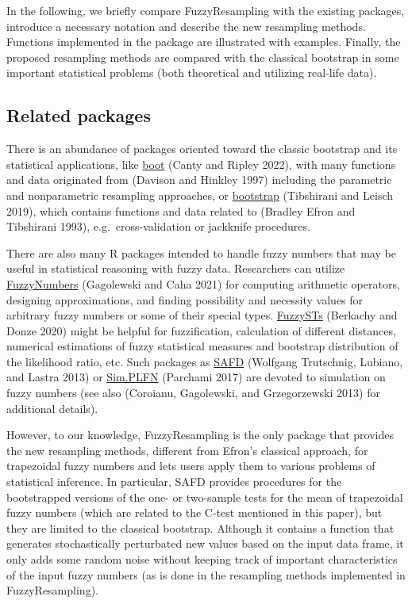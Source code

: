 In the following, we briefly compare FuzzyResampling with the existing
packages, introduce a necessary notation and describe the new resampling
methods. Functions implemented in the package are illustrated with
examples. Finally, the proposed resampling methods are compared with the
classical bootstrap in some important statistical problems (both
theoretical and utilizing real-life data).

\hypertarget{related-packages}{%
\subsection{Related packages}\label{related-packages}}

There is an abundance of packages oriented toward the classic bootstrap
and its statistical applications, like
\href{https://CRAN.R-project.org/package=boot}{boot} (Canty and Ripley 2022), with many
functions and data originated from (Davison and Hinkley 1997) including the
parametric and nonparametric resampling approaches, or
\href{https://CRAN.R-project.org/package=bootstrap}{bootstrap}
(Tibshirani and Leisch 2019), which contains functions and data related to
(Bradley Efron and Tibshirani 1993), e.g.~cross-validation or jackknife procedures.

There are also many R packages intended to handle fuzzy numbers that may
be useful in statistical reasoning with fuzzy data. Researchers can
utilize \href{https://CRAN.R-project.org/package=FuzzyNumbers}{FuzzyNumbers}
(Gagolewski and Caha 2021) for computing arithmetic operators, designing
approximations, and finding possibility and necessity values for
arbitrary fuzzy numbers or some of their special types.
\href{https://CRAN.R-project.org/package=FuzzySTs}{FuzzySTs} (Berkachy and Donze 2020)
might be helpful for fuzzification, calculation of different distances,
numerical estimations of fuzzy statistical measures and bootstrap
distribution of the likelihood ratio, etc. Such packages as
\href{https://CRAN.R-project.org/package=SAFD}{SAFD} (Wolfgang Trutschnig, Lubiano, and Lastra 2013) or
\href{https://CRAN.R-project.org/package=Sim.PLFN}{Sim.PLFN} (Parchami 2017)
are devoted to simulation on fuzzy numbers (see also (Coroianu, Gagolewski, and Grzegorzewski 2013)
for additional details).

However, to our knowledge, FuzzyResampling is the only package that
provides the new resampling methods, different from Efron's classical
approach, for trapezoidal fuzzy numbers and lets users apply them to
various problems of statistical inference. In particular, SAFD provides
procedures for the bootstrapped versions of the one- or two-sample tests
for the mean of trapezoidal fuzzy numbers (which are related to the
C-test mentioned in this paper), but they are limited to the classical
bootstrap. Although it contains a function that generates stochastically
perturbated new values based on the input data frame, it only adds some
random noise without keeping track of important characteristics of the
input fuzzy numbers (as is done in the resampling methods implemented in
FuzzyResampling).

